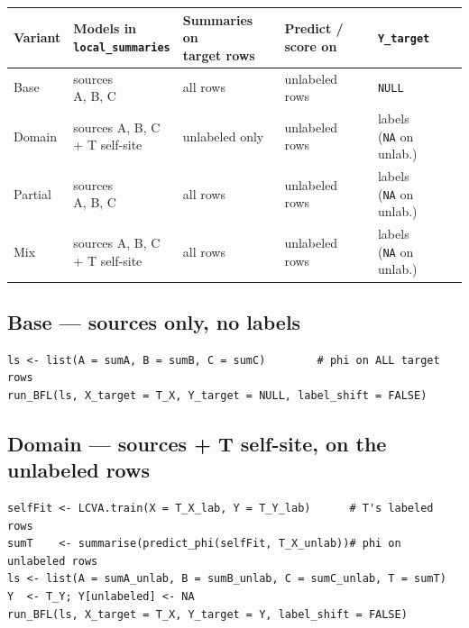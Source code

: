 \documentclass[11pt]{article}
\begin{document}
\begin{center}
\renewcommand{\arraystretch}{1.2}
\setlength{\tabcolsep}{11pt}
\begin{tabular}{@{}lllll@{}}
\toprule
\textbf{Variant} & \makecell[l]{\textbf{Models in}\\\textbf{\texttt{local\_summaries}}}
 & \makecell[l]{\textbf{Summaries on}\\\textbf{target rows}}
 & \makecell[l]{\textbf{Predict /}\\\textbf{score on}} & \textbf{\texttt{Y\_target}}\\
\midrule
Base    & \makecell[l]{sources\\A, B, C}               & all rows       & unlabeled rows & \texttt{NULL}\\
\addlinespace
Domain  & \makecell[l]{sources A, B, C\\+ T self-site}  & unlabeled only & unlabeled rows & \makecell[l]{labels\\(\texttt{NA} on unlab.)}\\
\addlinespace
Partial & \makecell[l]{sources\\A, B, C}               & all rows       & unlabeled rows & \makecell[l]{labels\\(\texttt{NA} on unlab.)}\\
\addlinespace
Mix     & \makecell[l]{sources A, B, C\\+ T self-site}  & all rows       & unlabeled rows & \makecell[l]{labels\\(\texttt{NA} on unlab.)}\\
\bottomrule
\end{tabular}
\end{center}

\subsection*{Base --- sources only, no labels}
\begin{lstlisting}[style=R]
ls <- list(A = sumA, B = sumB, C = sumC)        # phi on ALL target rows
run_BFL(ls, X_target = T_X, Y_target = NULL, label_shift = FALSE)
\end{lstlisting}

\subsection*{Domain --- sources + T self-site, on the unlabeled rows}
\begin{lstlisting}[style=R]
selfFit <- LCVA.train(X = T_X_lab, Y = T_Y_lab)      # T's labeled rows
sumT    <- summarise(predict_phi(selfFit, T_X_unlab))# phi on unlabeled rows
ls <- list(A = sumA_unlab, B = sumB_unlab, C = sumC_unlab, T = sumT)
Y  <- T_Y; Y[unlabeled] <- NA
run_BFL(ls, X_target = T_X, Y_target = Y, label_shift = FALSE)
\end{lstlisting}
\end{document}
